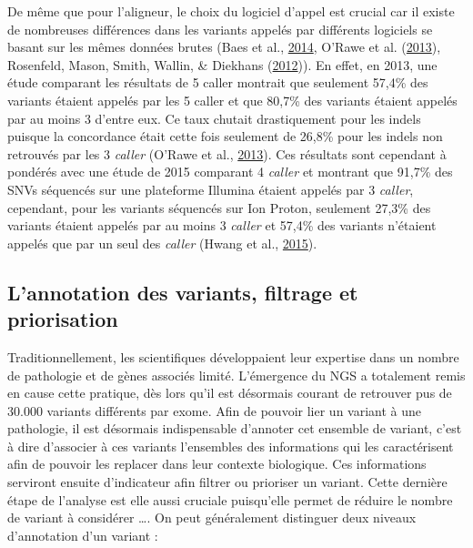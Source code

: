 \documentclass[12pt,twoside]{reedthesis}
\theoremstyle{definition}
\theoremstyle{definition}
\theoremstyle{remark}
\begin{document}
  De même que pour l'aligneur, le choix du logiciel d'appel est crucial
  car il existe de nombreuses différences dans les variants appelés par
  différents logiciels se basant sur les mêmes données brutes (Baes et
  al., \protect\hyperlink{ref-Baes2014}{2014}, O'Rawe et al.
  (\protect\hyperlink{ref-ORawe2013}{2013}), Rosenfeld, Mason, Smith,
  Wallin, \& Diekhans (\protect\hyperlink{ref-Rosenfeld2012}{2012})). En
  effet, en 2013, une étude comparant les résultats de 5 caller montrait
  que seulement 57,4\% des variants étaient appelés par les 5 caller et
  que 80,7\% des variants étaient appelés par au moins 3 d'entre eux. Ce
  taux chutait drastiquement pour les indels puisque la concordance était
  cette fois seulement de 26,8\% pour les indels non retrouvés par les 3
  \emph{caller} (O'Rawe et al., \protect\hyperlink{ref-ORawe2013}{2013}).
  Ces résultats sont cependant à pondérés avec une étude de 2015 comparant
  4 \emph{caller} et montrant que 91,7\% des SNVs séquencés sur une
  plateforme Illumina étaient appelés par 3 \emph{caller}, cependant, pour
  les variants séquencés sur Ion Proton, seulement 27,3\% des variants
  étaient appelés par au moins 3 \emph{caller} et 57,4\% des variants
  n'étaient appelés que par un seul des \emph{caller} (Hwang et al.,
  \protect\hyperlink{ref-Hwang2015}{2015}).
  
  \subsection{L'annotation des variants, filtrage et
  priorisation}\label{lannotation-des-variants-filtrage-et-priorisation}
  
  Traditionnellement, les scientifiques développaient leur expertise dans
  un nombre de pathologie et de gènes associés limité. L'émergence du NGS
  a totalement remis en cause cette pratique, dès lors qu'il est désormais
  courant de retrouver pus de 30.000 variants différents par exome. Afin
  de pouvoir lier un variant à une pathologie, il est désormais
  indispensable d'annoter cet ensemble de variant, c'est à dire d'associer
  à ces variants l'ensembles des informations qui les caractérisent afin
  de pouvoir les replacer dans leur contexte biologique. Ces informations
  serviront ensuite d'indicateur afin filtrer ou prioriser un variant.
  Cette dernière étape de l'analyse est elle aussi cruciale puisqu'elle
  permet de réduire le nombre de variant à considérer \ldots{}. On peut
  généralement distinguer deux niveaux d'annotation d'un variant :
  
\end{document}
